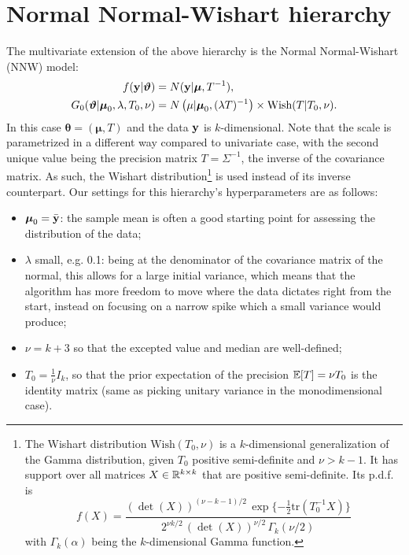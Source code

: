 \section{Normal Normal-Wishart hierarchy} \label{nnw}
The multivariate extension of the above hierarchy is the Normal Normal-Wishart (NNW) model:
\begin{equation}
	\begin{aligned}
		f(\textbf y|\boldsymbol\theta) &= N(\textbf y | \boldsymbol\mu ,T^{-1}), \\
		G_0(\boldsymbol\theta|\boldsymbol \mu_0, \lambda, T_0, \nu)
		&= N\left(\mu | \boldsymbol\mu_0, (\lambda T)^{-1}\right) \times \text{Wish}(T|T_0, \nu).
	\end{aligned}
\end{equation}
In this case $\boldsymbol\theta=(\boldsymbol\mu, T)$ and the data $\textbf y$ is $k$-dimensional.
Note that the scale is parametrized in a different way compared to univariate case, with the second unique value being the precision matrix $T = \Sigma^{-1}$, the inverse of the covariance matrix.
As such, the Wishart distribution\footnote{The Wishart distribution $\text{Wish}(T_0, \nu)$ is a $k$-dimensional generalization of the Gamma distribution, given $T_0$ positive semi-definite and $\nu > k-1$.
It has support over all matrices $X \in \RR^{k \times k}$ that are positive semi-definite.
Its p.d.f. is
$$f(X) = \frac{ (\det(X))^{(\nu-k-1)/2} \, \exp\{-\frac{1}{2} \text{tr}(T_0^{-1} X)\} }{ 2^{\nu k/2} \, (\det(X))^{\nu/2} \, \Gamma_k(\nu/2) } $$
with $\Gamma_k(\alpha)$ being the $k$-dimensional Gamma function.} is used instead of its inverse counterpart.
Our settings for this hierarchy's hyperparameters are as follows:
\begin{itemize}
	\item $\boldsymbol\mu_0 = \bar{\textbf y}$: the sample mean is often a good starting point for assessing the distribution of the data;
	\item $\lambda$ small, e.g. 0.1: being at the denominator of the covariance matrix of the normal, this allows for a large initial variance, which means that the algorithm has more freedom to move where the data dictates right from the start, instead on focusing on a narrow spike which a small variance would produce;
	\item $\nu = k + 3$ so that the excepted value and median are well-defined;
	\item $T_0 = \frac{1}{\nu} I_k$, so that the prior expectation of the precision $\EE[T] = \nu T_0$ is the identity matrix (same as picking unitary variance in the monodimensional case).
\end{itemize}
